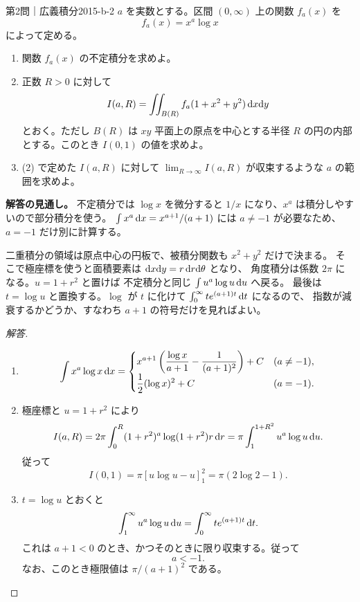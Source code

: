 \begin{problem}{第2問｜広義積分}{2015-b-2}
$a$ を実数とする。区間 $(0,\infty)$ 上の関数 $f_a(x)$ を
\[
f_a(x)=x^a\log x
\]
によって定める。
\begin{enumerate}
  \item[(1)] 関数 $f_a(x)$ の不定積分を求めよ。
  \item[(2)] 正数 $R>0$ に対して
  \[
  I(a,R)=\iint_{B(R)}f_a(1+x^2+y^2)\,\mathrm{d} x\mathrm{d} y
  \]
  とおく。ただし $B(R)$ は $xy$ 平面上の原点を中心とする半径 $R$ の円の内部とする。このとき $I(0,1)$ の値を求めよ。
  \item[(3)] (2) で定めた $I(a,R)$ に対して $\displaystyle\lim_{R\to\infty}I(a,R)$ が収束するような $a$ の範囲を求めよ。
\end{enumerate}
\end{problem}
\begin{memo*}
\textbf{解答の見通し。}
不定積分では $\log x$ を微分すると $1/x$ になり、$x^a$ は積分しやすいので部分積分を使う。
$\int x^a\,\mathrm{d} x=x^{a+1}/(a+1)$ には $a\ne-1$ が必要なため、$a=-1$ だけ別に計算する。

二重積分の領域は原点中心の円板で、被積分関数も $x^2+y^2$ だけで決まる。
そこで極座標を使うと面積要素は $\mathrm{d} x\mathrm{d} y=r\,\mathrm{d} r\mathrm{d}\theta$ となり、
角度積分は係数 $2\pi$ になる。$u=1+r^2$ と置けば
不定積分と同じ $\int u^a\log u\,\mathrm{d} u$ へ戻る。
最後は $t=\log u$ と置換する。$\log$ が $t$ に化けて $\int_0^\infty te^{(a+1)t}\,\mathrm{d} t$ になるので、
指数が減衰するかどうか、すなわち $a+1$ の符号だけを見ればよい。
\end{memo*}
\begin{proof}[解答]
\begin{enumerate}
  \item[(1)]
  \[
  \int x^a\log x\,\mathrm{d} x=
  \begin{cases}
  \displaystyle
  x^{a+1}\left(\frac{\log x}{a+1}-\frac1{(a+1)^2}\right)+C &(a\ne-1),\\[2mm]
  \displaystyle\frac12(\log x)^2+C &(a=-1).
  \end{cases}
  \]

  \item[(2)] 極座標と $u=1+r^2$ により
  \[
  I(a,R)=2\pi\int_0^R(1+r^2)^a\log(1+r^2)r\,\mathrm{d} r
  =\pi\int_1^{1+R^2}u^a\log u\,\mathrm{d} u.
  \]
  従って
  \[
  I(0,1)=\pi[u\log u-u]_1^2=\pi(2\log2-1).
  \]

  \item[(3)] $t=\log u$ とおくと
  \[
  \int_1^\infty u^a\log u\,\mathrm{d} u
  =\int_0^\infty te^{(a+1)t}\,\mathrm{d} t.
  \]
  これは $a+1<0$ のとき、かつそのときに限り収束する。従って
  \[
  a<-1.
  \]
  なお、このとき極限値は $\pi/(a+1)^2$ である。
\end{enumerate}
\end{proof}

